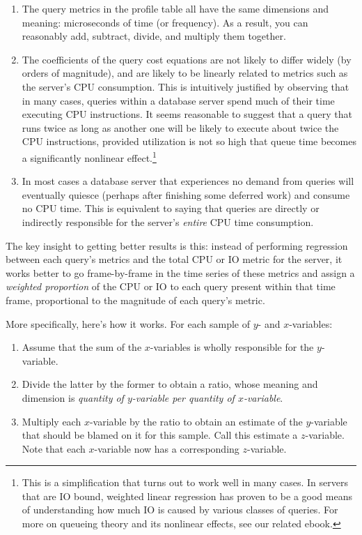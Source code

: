\documentclass{vivid_layout}
\begin{document}
\begin{enumerate}
\item The query metrics in the profile table all have the same dimensions and meaning: microseconds of time (or frequency). As a result, you can reasonably add, subtract, divide, and multiply them together.
\item The coefficients of the query cost equations are not likely to differ widely (by orders of magnitude), and are likely to be linearly related to metrics such as the server's CPU consumption. This is intuitively justified by observing that in many cases, queries within a database server spend much of their time executing CPU instructions. It seems reasonable to suggest that a query that runs twice as long as another one will be likely to execute about twice the CPU instructions, provided utilization is not so high that queue time becomes a significantly nonlinear effect.\footnote{This is a simplification that turns out to work well in many cases. In servers that are IO bound, weighted linear regression has proven to be a good means of understanding how much IO is caused by various classes of queries. For more on queueing theory and its nonlinear effects, see our related ebook.}
\item In most cases a database server that experiences no demand from queries will eventually quiesce (perhaps after finishing some deferred work) and consume no CPU time. This is equivalent to saying that queries are directly or indirectly responsible for the server's \emph{entire} CPU time consumption.
\end{enumerate}

The key insight to getting better results is this: instead of performing regression between each query's metrics and the total CPU or IO metric for the server, it works better to go frame-by-frame in the time series of these metrics and assign a \emph{weighted proportion} of the CPU or IO to each query present within that time frame, proportional to the magnitude of each query's metric.

More specifically, here's how it works. For each sample of $y$- and $x$-variables:

\begin{enumerate}
\item Assume that the sum of the $x$-variables is wholly responsible for the $y$-variable.
\item Divide the latter by the former to obtain a ratio, whose meaning and dimension is \emph{quantity of $y$-variable per quantity of $x$-variable}.
\item Multiply each $x$-variable by the ratio to obtain an estimate of the $y$-variable that should be blamed on it for this sample. Call this estimate a $z$-variable. Note that each $x$-variable now has a corresponding $z$-variable.
\end{enumerate}
\end{document}
